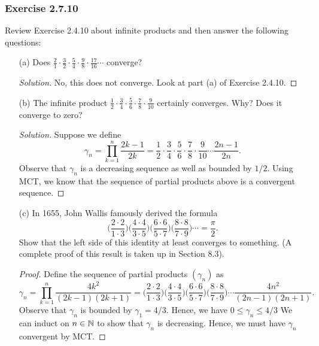 \subsubsection{Exercise 2.7.10} Review Exercise 2.4.10 about infinite products and then answer the following questions: 
\begin{enumerate}
    \item[(a)] Does \( \frac{ 2 }{ 1 }  \cdot \frac{ 3 }{ 2 }  \cdot \frac{ 5 }{ 4 } \cdot \frac{ 9 }{ 8 }  \cdot \frac{ 17 }{ 16 }  \dotsb \) converge? 
        \begin{proof}[Solution]
        No, this does not converge. Look at part (a) of Exercise 2.4.10.
        \end{proof}
    \item[(b)] The infinite product \( \frac{ 1 }{ 2 }  \cdot \frac{ 3 }{ 4 }  \cdot \frac{ 5 }{ 6 } \cdot \frac{ 7 }{ 8  }  \cdot \frac{ 9 }{ 10 }  \) certainly converges. Why? Does it converge to zero? 
        \begin{proof}[Solution]
        Suppose we define 
        \[  \gamma_{n} = \prod_{k=1}^{n} \frac{ 2k -1  }{ 2k  }  = \frac{ 1 }{ 2 }  \cdot \frac{ 3 }{ 4 }  \cdot \frac{ 5 }{ 6 } \cdot \frac{ 7 }{ 8 }  \cdot \frac{ 9 }{ 10 } \dotsb \frac{ 2n-1 }{ 2n }. \]
        Observe that \( \gamma_{n}  \) is a decreasing sequence as well as bounded by \( 1/2  \). Using MCT, we know that the sequence of partial products above is a convergent sequence.
        \end{proof}
    \item[(c)] In 1655, John Wallis famously derived the formula 
        \[  \Big( \frac{ 2 \cdot 2  }{  1 \cdot 3  } \Big) \Big( \frac{ 4 \cdot 4  }{ 3 \cdot 5  }  \Big) \Big( \frac{ 6 \cdot 6  }{  5 \cdot 7  }  \Big) \Big( \frac{ 8 \cdot 8  }{ 7 \cdot 9  }  \Big) \dotsb = \frac{ \pi  }{ 2  }.  \]
        Show that the left side of this identity at least converges to something. (A complete proof of this result is taken up in Section 8.3).
        \begin{proof}
        Define the sequence of partial products \( (\gamma_{n}) \) as 
        \[  \gamma_{n} = \prod_{k=1}^{n} \frac{ 4 k^{2}  }{ (2k-1)(2k+1)  } = \Big( \frac{ 2 \cdot 2  }{  1 \cdot 3  } \Big) \Big( \frac{ 4 \cdot 4  }{ 3 \cdot 5  }  \Big) \Big( \frac{ 6 \cdot 6  }{  5 \cdot 7  }  \Big) \Big( \frac{ 8 \cdot 8  }{ 7 \cdot 9  }  \Big) \dotsb \frac{ 4 n^{2}  }{  (2n-1)(2n+1) }.     \]
     Observe that \( \gamma_n   \) is bounded by \( \gamma_{1} = 4 / 3  \). Hence, we have \( 0 \leq \gamma_{n} \leq 4/3 \) We can induct on \( n \in \mathbb{N}  \) to show that \( \gamma_{n}  \) is decreasing. Hence, we must have \( \gamma_{n}  \) convergent by MCT.
        \end{proof}
\end{enumerate}



